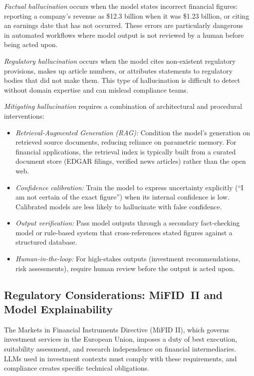 \begin{context}
\emph{Factual hallucination} occurs when the model states incorrect financial
figures: reporting a company's revenue as \$12.3 billion when it was
\$1.23 billion, or citing an earnings date that has not occurred.  These errors
are particularly dangerous in automated workflows where model output is not
reviewed by a human before being acted upon.

\emph{Regulatory hallucination} occurs when the model cites non-existent
regulatory provisions, makes up article numbers, or attributes statements to
regulatory bodies that did not make them.  This type of hallucination is
difficult to detect without domain expertise and can mislead compliance teams.

\emph{Mitigating hallucination} requires a combination of architectural and
procedural interventions:
\begin{itemize}
  \item \emph{Retrieval-Augmented Generation (RAG):} Condition the model's
        generation on retrieved source documents, reducing reliance on
        parametric memory.  For financial applications, the retrieval index
        is typically built from a curated document store (EDGAR filings,
        verified news articles) rather than the open web.
  \item \emph{Confidence calibration:} Train the model to express uncertainty
        explicitly (``I am not certain of the exact figure'') when its internal
        confidence is low.  Calibrated models are less likely to hallucinate
        with false confidence.
  \item \emph{Output verification:} Pass model outputs through a secondary
        fact-checking model or rule-based system that cross-references stated
        figures against a structured database.
  \item \emph{Human-in-the-loop:} For high-stakes outputs (investment recommendations,
        risk assessments), require human review before the output is acted upon.
\end{itemize}

\subsection{Regulatory Considerations: MiFID~II and Model Explainability}
\label{subsec:regulatory}

The Markets in Financial Instruments Directive (MiFID II), which governs
investment services in the European Union, imposes a duty of best execution,
suitability assessment, and research independence on financial intermediaries.
LLMs used in investment contexts must comply with these requirements, and
compliance creates specific technical obligations.


\end{context}
